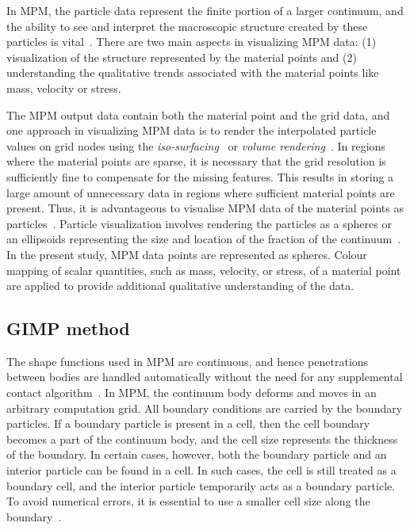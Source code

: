 In MPM, the particle data represent the finite portion of a larger 
continuum, and the ability to see and interpret the 
macroscopic structure created by these particles is vital~\citep{bigler2006}. 
There are two main aspects in visualizing MPM data: (1) visualization of 
the structure represented by the material points and (2) understanding the 
qualitative trends associated with the material points like mass, velocity or 
stress.

The MPM output data contain both the material point and the grid data, and
one approach in visualizing MPM data is to render the interpolated 
particle values on grid nodes using the 
\textit{iso-surfacing}~\citep{lorensen1987} 
or \textit{volume rendering}~\citep{levoy1988}. In regions where the 
material points are sparse, it is necessary that the grid resolution is 
sufficiently fine to compensate for the missing features. This results in 
storing a large amount of unnecessary data in regions where sufficient material 
points are present. Thus, it is advantageous to visualise MPM data of the 
material points as particles~\citep{bigler2006}. Particle visualization 
involves rendering the particles as a spheres or an ellipsoids representing the 
size and location of the fraction of the 
continuum~\citep{kuester2001,krogh1997,gumhold2003}. In the present study, MPM 
data points are represented as spheres.  Colour mapping of scalar 
quantities, such as mass, velocity, or stress, of a material point are applied 
to provide additional qualitative understanding of the data.


\subsection{GIMP method}

The shape functions used in MPM are continuous, and hence penetrations between 
bodies are handled automatically without the need for any supplemental contact 
algorithm~\citep{Chen2002}. In MPM, the continuum body deforms and moves in 
an arbitrary computation grid. All boundary conditions are carried by 
the boundary particles. If a boundary particle is present in a cell, then the 
cell boundary becomes a part of the continuum body, and the cell size 
represents the thickness of the boundary. In certain cases, however, both the 
boundary particle and an interior particle can be found in a cell. In such 
cases, the cell is still treated as a boundary cell, and the interior particle 
temporarily acts as a boundary particle. To avoid numerical errors, it is 
essential to use a smaller cell size along the boundary~\citep{Chen2002}. 

